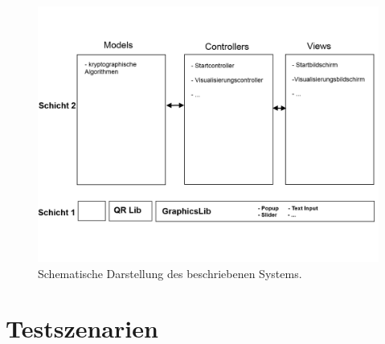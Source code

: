 \documentclass{article}
\begin{document}
\begin{figure}[h!]
  \centering
    \includegraphics[width=\textwidth]{resources/systemmodel-draft}
  \caption{Schematische Darstellung des beschriebenen Systems.}
\end{figure}

\section{Testszenarien}
\end{document}
